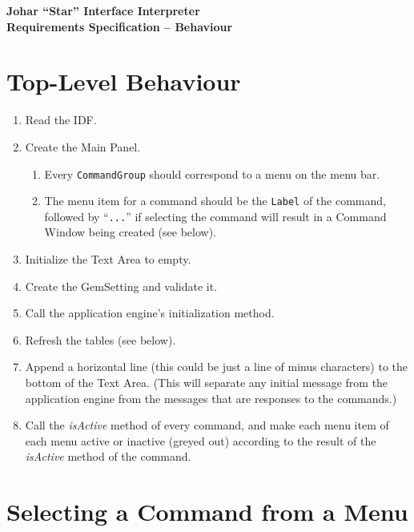 \documentclass[11pt]{article}
\begin{document}
\begin{center} \bf \Large
Johar ``Star'' Interface Interpreter \\
Requirements Specification -- Behaviour
\end{center}

\section{Top-Level Behaviour}

\begin{enumerate}
\item Read the IDF.
\item Create the Main Panel.
  \begin{enumerate}
  \item Every {\tt CommandGroup} should correspond to a menu on the
    menu bar.
  \item The menu item for a command should be the {\tt Label}
    of the command, followed by ``{\tt ...}'' if selecting the 
    command will result in a Command Window being created (see below).
  \end{enumerate}
\item Initialize the Text Area to empty.
\item Create the GemSetting and validate it.
\item Call the application engine's initialization method.
\item Refresh the tables (see below).
\item Append a horizontal line (this could be just a line of minus
  characters) to the bottom of the Text Area.  (This will separate any
  initial message from the application engine from the messages that are
  responses to the commands.)
\item Call the {\it isActive} method of every command, and make each menu
  item of each menu active or inactive (greyed out) according to the
  result of the {\it isActive} method of the command.
\end{enumerate}

\section{Selecting a Command from a Menu}
\end{document}

